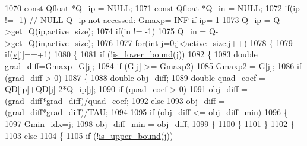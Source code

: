 \begin{DoxyCode}
1070     \textcolor{keyword}{const} \hyperlink{svm_8cpp_a8755d90a54ecfb8d15051af3e0542592}{Qfloat} *Q\_ip = NULL;
1071     \textcolor{keyword}{const} \hyperlink{svm_8cpp_a8755d90a54ecfb8d15051af3e0542592}{Qfloat} *Q\_in = NULL;
1072     \textcolor{keywordflow}{if}(ip != -1) \textcolor{comment}{// NULL Q\_ip not accessed: Gmaxp=-INF if ip=-1}
1073         Q\_ip = \hyperlink{class_solver_a2d3461718f0570bdc47f5dfb31d61e0a}{Q}->\hyperlink{class_q_matrix_a87c11086390c81293d2978e042be3d10}{get\_Q}(ip,active\_size);
1074     \textcolor{keywordflow}{if}(in != -1)
1075         Q\_in = \hyperlink{class_solver_a2d3461718f0570bdc47f5dfb31d61e0a}{Q}->\hyperlink{class_q_matrix_a87c11086390c81293d2978e042be3d10}{get\_Q}(in,active\_size);
1076 
1077     \textcolor{keywordflow}{for}(\textcolor{keywordtype}{int} j=0;j<\hyperlink{class_solver_a06ba1b87b3749cc545e573151b7beca0}{active\_size};j++)
1078     \{
1079         \textcolor{keywordflow}{if}(\hyperlink{class_solver_a3acc1043d06dedf87f054ff3eea5c426}{y}[j]==+1)
1080         \{
1081             \textcolor{keywordflow}{if} (!\hyperlink{class_solver_a5876eedb0a6de6954f6037af0992cbed}{is\_lower\_bound}(j))   
1082             \{
1083                 \textcolor{keywordtype}{double} grad\_diff=Gmaxp+\hyperlink{class_solver_ad8ab27068f2e045591970aae1201afe9}{G}[j];
1084                 \textcolor{keywordflow}{if} (G[j] >= Gmaxp2)
1085                     Gmaxp2 = G[j];
1086                 \textcolor{keywordflow}{if} (grad\_diff > 0)
1087                 \{
1088                     \textcolor{keywordtype}{double} obj\_diff;
1089                     \textcolor{keywordtype}{double} quad\_coef = \hyperlink{class_solver_a7c7b7b1207983543855165e8eb249f2a}{QD}[ip]+\hyperlink{class_solver_a7c7b7b1207983543855165e8eb249f2a}{QD}[j]-2*Q\_ip[j];
1090                     \textcolor{keywordflow}{if} (quad\_coef > 0)
1091                         obj\_diff = -(grad\_diff*grad\_diff)/quad\_coef;
1092                     \textcolor{keywordflow}{else}
1093                         obj\_diff = -(grad\_diff*grad\_diff)/\hyperlink{svm_8cpp_a3d8c9c145887af5174ba4cc6789862ad}{TAU};
1094 
1095                     \textcolor{keywordflow}{if} (obj\_diff <= obj\_diff\_min)
1096                     \{
1097                         Gmin\_idx=j;
1098                         obj\_diff\_min = obj\_diff;
1099                     \}
1100                 \}
1101             \}
1102         \}
1103         \textcolor{keywordflow}{else}
1104         \{
1105             \textcolor{keywordflow}{if} (!\hyperlink{class_solver_a98d878b13d6f710fcaa0b16e657a37b6}{is\_upper\_bound}(j))

\end{DoxyCode}
